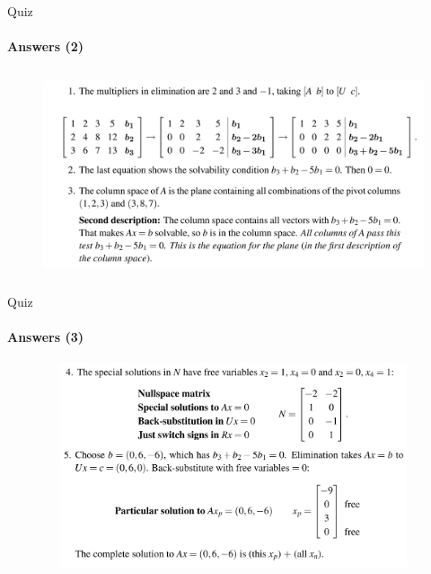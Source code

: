 \documentclass[aspectratio=169]{beamer}
\begin{document}
\begin{frame}[t]{Quiz}
    \vspace{-0.35cm}
    \framesubtitle{Answers (2)}
    \begin{figure}[H]
        \centering\includegraphics[height=6cm,width=1\textwidth,keepaspectratio]{quiz21.png}
        \label{fig:quiz21.png}
    \end{figure}
\end{frame}

\begin{frame}[t]{Quiz}
    \framesubtitle{Answers (3)}
    \vspace{-0.35cm}
    \begin{figure}[H]
        \centering\includegraphics[height=6cm,width=1\textwidth,keepaspectratio]{quiz22.png}
        \label{fig:quiz22.png}
    \end{figure}
\end{frame}




\end{document}
